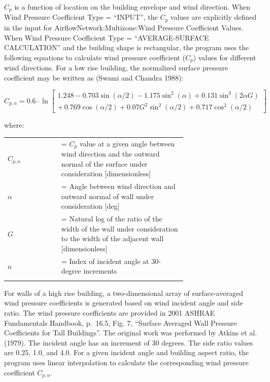 $C_p$ is a function of location on the building envelope and wind direction. When Wind Pressure Coefficient Type = ``INPUT'', the $C_p$ values are explicitly defined in the input for AirflowNetwork:Multizone:Wind Pressure Coefficient Values. When Wind Pressure Coefficient Type = ``AVERAGE-SURFACE CALCULATION'' and the building shape is rectangular, the program uses the following equations to calculate wind pressure coefficient ($C_p$) values for different wind directions. For a low rise building, the normalized surface pressure coefficient may be written as (Swami and Chandra 1988):

\begin{equation}
C_{p,n} = 0.6 \cdot \ln \left[ \begin{array}{l}1.248 - 0.703\sin (\alpha /2) - 1.175{\sin ^2}(\alpha ) + 0.131{\sin ^3}(2\alpha G)\\ + \,0.769\cos (\alpha /2) + 0.07{G^2}{\sin ^2}(\alpha /2) + 0.717{\cos ^2}(\alpha /2)\end{array} \right]
\end{equation}

where:

\begin{tabular}{lp{0.7\linewidth}}
\\
$C_{p,n}$ &= $C_p$ value at a given angle between wind direction and the outward normal of the surface under consideration [dimensionless]\\
$\alpha$ &= Angle between wind direction and outward normal of wall under consideration [deg]\\
$G$ &= Natural log of the ratio of the width of the wall under consideration to the width of the adjacent wall [dimensionless]\\
$n$ &= Index of incident angle at 30-degree increments\\
\\
\end{tabular}

For walls of a high rise building, a two-dimensional array of surface-averaged wind pressure coefficients is generated based on wind incident angle and side ratio. The wind pressure coefficients are provided in 2001 ASHRAE Fundamentals Handbook, p.~16.5, Fig. 7, ``Surface Averaged Wall Pressure Coefficients for Tall Buildings''. The original work was performed by Atkins et al. (1979). The incident angle has an increment of 30 degrees. The side ratio values are 0.25, 1.0, and 4.0. For a given incident angle and building aspect ratio, the program uses linear interpolation to calculate the corresponding wind pressure coefficient $C_{p,n}$.

